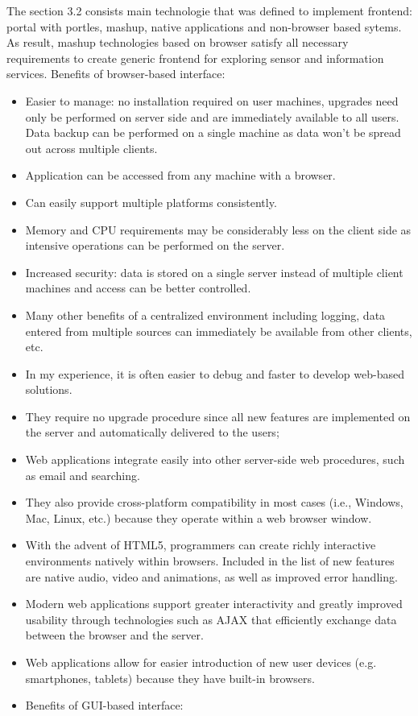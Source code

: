 The section 3.2 consists main technologie that was defined to implement frontend: portal with portles, mashup, native applications and non-browser based sytems. As result, mashup technologies based on browser satisfy all necessary requirements to create generic frontend for exploring sensor and information services. 
Benefits of browser-based interface:
\begin{itemize}
\item Easier to manage: no installation required on user machines, upgrades need only be performed on server side and are immediately available to all users. Data backup can be performed on a single machine as data won't be spread out across multiple clients.
\item Application can be accessed from any machine with a browser.
\item Can easily support multiple platforms consistently.
\item Memory and CPU requirements may be considerably less on the client side as intensive operations can be performed on the server.
\item Increased security: data is stored on a single server instead of multiple client machines and access can be better controlled.
\item Many other benefits of a centralized environment including logging, data entered from multiple sources can immediately be available from other clients, etc.
\item In my experience, it is often easier to debug and faster to develop web-based solutions.
\item They require no upgrade procedure since all new features are implemented on the server and automatically delivered to the users;
\item Web applications integrate easily into other server-side web procedures, such as email and searching.
\item They also provide cross-platform compatibility in most cases (i.e., Windows, Mac, Linux, etc.) because they operate within a web browser window.
\item With the advent of HTML5, programmers can create richly interactive environments natively within browsers. Included in the list of new features are native audio, video and animations, as well as improved error handling.
\item Modern web applications support greater interactivity and greatly improved usability through technologies such as AJAX that efficiently exchange data between the browser and the server.
\item Web applications allow for easier introduction of new user devices (e.g. smartphones, tablets) because they have built-in browsers.
\item Benefits of GUI-based interface:


\end{itemize}
